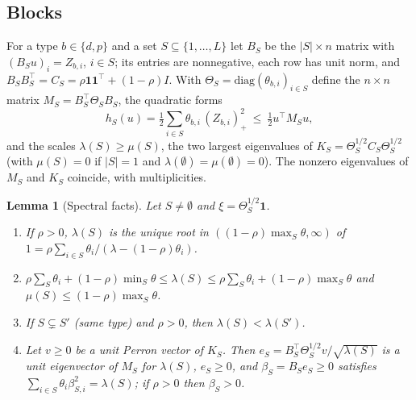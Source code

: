\documentclass[pdflatex,sn-mathphys-ay]{sn-jnl}%
\theoremstyle{thmstyleone}%
\newtheorem{lemma}{Lemma}
\theoremstyle{thmstylethree}%
\theoremstyle{thmstyletwo}%
\newcommand{\one}{\mathbf{1}}
\begin{document}
\subsection{Blocks}
For a type $b\in\{d,p\}$ and a set $S\subseteq\{1,\dots,L\}$ let $B_S$ be the $|S|\times n$
matrix with $(B_Su)_i=Z_{b,i}$, $i\in S$; its entries are nonnegative, each row has unit
norm, and $B_SB_S^\top=C_S=\rho\one\one^\top+(1-\rho)I$. With
$\Theta_S=\mathrm{diag}(\theta_{b,i})_{i\in S}$ define the $n\times n$ matrix
$M_S=B_S^\top\Theta_SB_S$, the quadratic forms
\[
h_S(u)=\tfrac12\sum_{i\in S}\theta_{b,i}\,(Z_{b,i})_+^2\ \le\ \tfrac12u^\top M_Su ,
\]
and the scales $\lambda(S)\ge\mu(S)$, the two largest eigenvalues of
$K_S=\Theta_S^{1/2}C_S\Theta_S^{1/2}$ (with $\mu(S)=0$ if $|S|=1$ and
$\lambda(\emptyset)=\mu(\emptyset)=0$). The nonzero eigenvalues of $M_S$ and $K_S$
coincide, with multiplicities.

\begin{lemma}[Spectral facts]\label{lem:spectral}
Let $S\ne\emptyset$ and $\xi=\Theta_S^{1/2}\one$.
\begin{enumerate}
\item[(a)] If $\rho>0$, $\lambda(S)$ is the unique root in
$((1-\rho)\max_{S}\theta,\infty)$ of
$1=\rho\sum_{i\in S}\theta_i/(\lambda-(1-\rho)\theta_i)$.
\item[(b)] $\rho\sum_S\theta_i+(1-\rho)\min_S\theta\le\lambda(S)\le\rho\sum_S\theta_i+(1-\rho)\max_S\theta$
and $\mu(S)\le(1-\rho)\max_S\theta$.
\item[(c)] If $S\subsetneq S'$ (same type) and $\rho>0$, then $\lambda(S)<\lambda(S')$.
\item[(d)] Let $v\ge0$ be a unit Perron vector of $K_S$. Then $e_S=B_S^\top\Theta_S^{1/2}v/\sqrt{\lambda(S)}$
is a unit eigenvector of $M_S$ for $\lambda(S)$, $e_S\ge0$, and $\beta_S=B_Se_S\ge0$
satisfies $\sum_{i\in S}\theta_i\beta_{S,i}^2=\lambda(S)$; if $\rho>0$ then $\beta_S>0$.
\end{enumerate}
\end{lemma}
\end{document}
